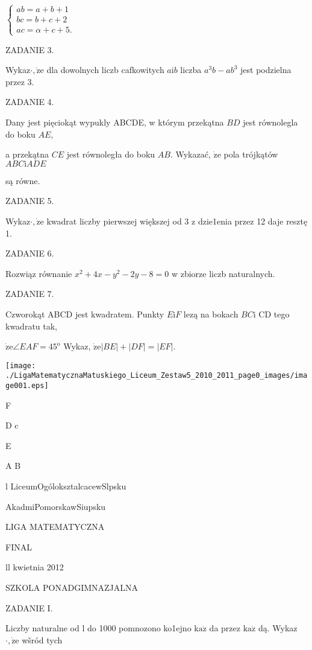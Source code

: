 \documentclass[a4paper,12pt]{article}
\begin{document}
$\left\{\begin{array}{l}
ab=a+b+1\\
bc=b+c+2\\
ac=\alpha+c+5.
\end{array}\right.$

ZADANIE 3.

Wykaz$\cdot, \dot{\mathrm{z}}\mathrm{e}$ dla dowolnych liczb cafkowitych $a\mathrm{i}b$ liczba $a^{3}b-ab^{3}$ jest podzielna przez 3.

ZADANIE 4.

Dany jest pięciokąt wypukly ABCDE, w którym przekątna $BD$ jest równolegla do boku $AE,$

a przekątna $CE$ jest równoległa do boku $AB$. Wykazać, $\dot{\mathrm{z}}\mathrm{e}$ pola trójkątów $ABC \mathrm{i} ADE$

są równe.

ZADANIE 5.

Wykaz$\cdot, \dot{\mathrm{z}}\mathrm{e}$ kwadrat liczby pierwszej większej od 3 z dzie1enia przez 12 daje resztę 1.

ZADANIE 6.

Rozwiąz równanie $x^{2}+4x-y^{2}-2y-8=0$ w zbiorze liczb naturalnych.

ZADANIE 7.

Czworokąt ABCD jest kwadratem. Punkty $E\mathrm{i}F$ lezą na bokach $BC\mathrm{i}$ CD tego kwadratu tak,

$\dot{\mathrm{z}}\mathrm{e}\angle EAF=45^{\mathrm{o}}$ Wykaz, $\dot{\mathrm{z}}\mathrm{e}|BE|+|DF|=|EF|.$
\begin{center}
\texttt{[image: ./LigaMatematycznaMatuskiego\_Liceum\_Zestaw5\_2010\_2011\_page0\_images/image001.eps]}
\end{center}
F

D c

E

A  B






l LiceumOgóloksztalcacewSlpsku

AkadmiPomorskawSiupsku

LIGA MATEMATYCZNA

FINAL

ll kwietnia 2012

SZKOLA PONADGIMNAZJALNA

ZADANIE I.

Liczby naturalne od l do 1000 pomnozono ko1ejno $\mathrm{k}\mathrm{a}\dot{\mathrm{z}}$ da przez $\mathrm{k}\mathrm{a}\dot{\mathrm{z}}$ dą. Wykaz$\cdot, \dot{\mathrm{z}}\mathrm{e}$ wšród tych
\end{document}
